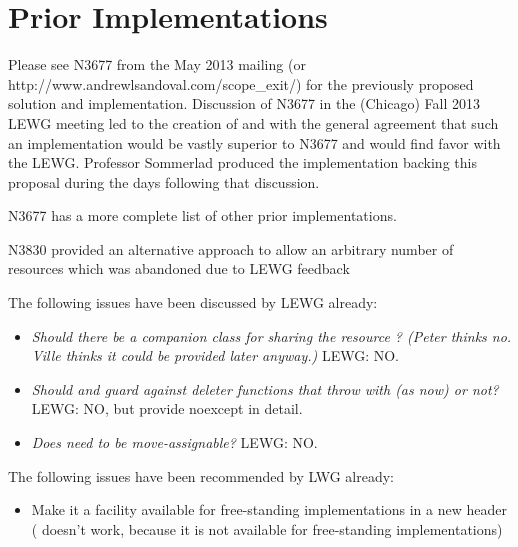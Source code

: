 \documentclass[ebook,11pt,article]{memoir}
\begin{document}
\section{Prior Implementations}
Please see N3677 from the May 2013 mailing (or http://www.andrewlsandoval.com/scope_exit/) for the previously proposed solution and implementation.  Discussion of N3677 in the (Chicago) Fall 2013 LEWG meeting led to the creation of  and  with the general agreement that such an implementation would be vastly superior to N3677 and would find favor with the LEWG.  Professor Sommerlad produced the implementation backing this proposal during the days following that discussion.

N3677 has a more complete list of other prior implementations.

N3830 provided an alternative approach to allow an arbitrary number of resources which was abandoned due to LEWG feedback 

The following issues have been discussed by LEWG already:
\begin{itemize}
\item \textit{Should there be a companion class for sharing the resource  ?  (Peter thinks no. Ville thinks it could be provided later anyway.) } LEWG: NO.
\item \textit{Should  and  guard against deleter functions that throw with  (as now) or not?} LEWG: NO, but provide noexcept in detail.
\item \textit{Does  need to be move-assignable? } LEWG: NO.
\end{itemize}

The following issues have been recommended by LWG already:
\begin{itemize}
\item Make it a facility available for free-standing implementations in a new header  ( doesn't work, because it is not available for free-standing implementations)
\end{itemize}
\end{document}

